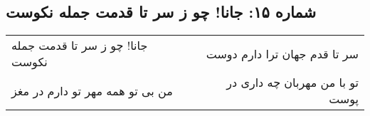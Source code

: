 \begin{center}
\section*{شماره ۱۵: جانا! چو ز سر تا قدمت جمله نکوست}
\label{sec:015}
\begin{longtable}{l p{0.5cm} r}
جانا! چو ز سر تا قدمت جمله نکوست
&&
سر تا قدم جهان ترا دارم دوست
\\
من بی تو همه مهر تو دارم در مغز
&&
تو با من مهربان چه داری در پوست
\\
\end{longtable}
\end{center}
